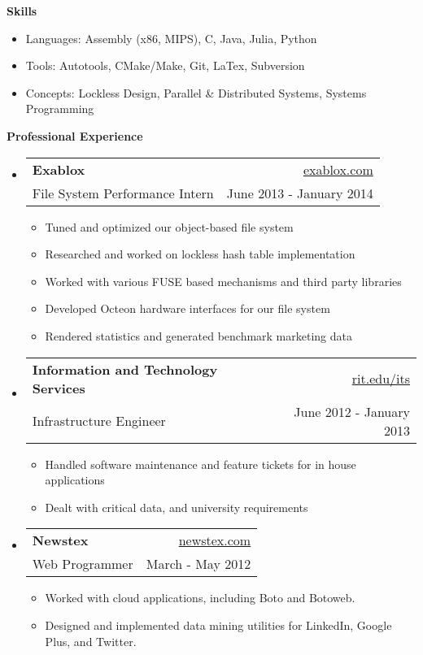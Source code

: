 \documentclass[letterpaper,11pt]{article}
\makeatletter
\newcommand{\resheading}[1]{{\large \colorbox{mygrey}{\begin{minipage}{\textwidth}{\textbf{#1 \vphantom{p\^{E}}}}\end{minipage}}}}
\newcommand{\ressubheading}[4]{
\begin{tabular*}{6.5in}{l@{\extracolsep{\fill}}r}
		\textbf{#1} & #2 \\
		{#3} & {#4} \\
\end{tabular*}\vspace{-6pt}}
\makeatother
\begin{document}
\resheading{{Skills}}
{ \footnotesize
		\begin{itemize}
			\item{Languages: Assembly (x86, MIPS), C, Java, Julia, Python}
			\item{Tools: Autotools, CMake/Make, Git, LaTex, Subversion}
			\item{Concepts: Lockless Design, Parallel \& Distributed Systems, Systems Programming}
		\end{itemize}
}
\resheading{Professional Experience}
{\footnotesize
	\begin{itemize}
			\item
			\ressubheading{Exablox}{\href{http://www.exablox.com/}{exablox.com}}{File System Performance Intern}{June 2013 - January 2014}
			{ \footnotesize
				\begin{itemize}
					\item{Tuned and optimized our object-based file system}
					\item{Researched and worked on lockless hash table implementation}
					\item{Worked with various FUSE based mechanisms and third party libraries}
					\item{Developed Octeon hardware interfaces for our file system}
					\item{Rendered statistics and generated benchmark marketing data}
				\end{itemize}
			}
			\item 
			\ressubheading{Information and Technology Services}{\href{http://www.rit.edu/its/}{rit.edu/its}}{Infrastructure Engineer}{June 2012 - January 2013}
			{ \footnotesize
				\begin{itemize}
					\item{Handled software maintenance and feature tickets for in house applications}
					\item{Dealt with critical data, and university requirements}
				\end{itemize}
			}
		\item	
			\ressubheading{Newstex}{\href{http://www.newstex.com/}{newstex.com}}{Web Programmer}{March - May 2012} 
				{ \footnotesize 
				\begin{itemize}
					\item{Worked with cloud applications, including Boto and Botoweb.}
					\item{Designed and implemented data mining utilities for LinkedIn, Google Plus, and Twitter.}
				\end{itemize}
}
\end{itemize}}
\end{document}
